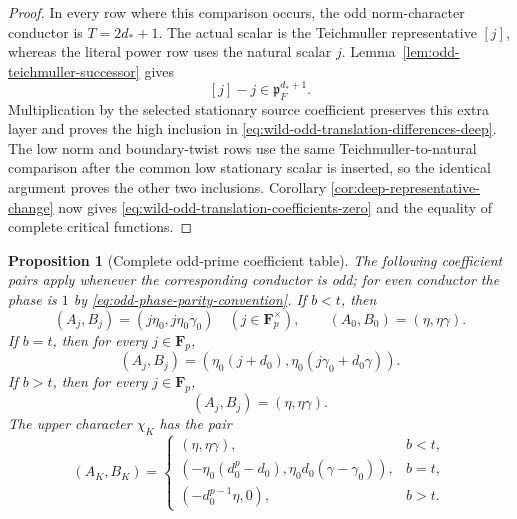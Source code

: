 \documentclass[11pt]{amsart}
\newtheorem{proposition}[theorem]{Proposition}
\theoremstyle{definition}
\theoremstyle{remark}
\newcommand{\F}{\mathbf F}
\newcommand{\p}{\mathfrak p}
\begin{document}
\begin{proof}
In every row where this comparison occurs, the odd norm-character
conductor is $T=2d_*+1$.  The actual scalar is the Teichmuller
representative $[j]$, whereas the literal power row uses the natural
scalar $j$.  Lemma~\ref{lem:odd-teichmuller-successor} gives
\[
 [j]-j\in\p_F^{d_*+1}.
\]
Multiplication by the selected stationary source coefficient preserves
this extra layer and proves the high inclusion in
\eqref{eq:wild-odd-translation-differences-deep}.  The low norm and
boundary-twist rows use the same Teichmuller-to-natural comparison after
the common low stationary scalar is inserted, so the identical argument
proves the other two inclusions.  Corollary
\ref{cor:deep-representative-change} now gives
\eqref{eq:wild-odd-translation-coefficients-zero} and the equality of
complete critical functions.
\end{proof}

\begin{proposition}[Complete odd-prime coefficient table]
\label{prop:odd-coefficient-table}
The following coefficient pairs apply whenever the corresponding
conductor is odd; for even conductor the phase is $1$ by
\eqref{eq:odd-phase-parity-convention}.  If $b<t$, then
\begin{equation}\label{eq:lower-coeff-table-below}
 (A_j,B_j)=(j\eta_0,j\eta_0\gamma_0)
 \quad(j\in\F_p^\times),
 \qquad
 (A_0,B_0)=(\eta,\eta\gamma).
\end{equation}
If $b=t$, then for every $j\in\F_p$,
\begin{equation}\label{eq:lower-coeff-table-boundary}
 (A_j,B_j)=
 (\eta_0(j+d_0),\eta_0(j\gamma_0+d_0\gamma)).
\end{equation}
If $b>t$, then for every $j\in\F_p$,
\begin{equation}\label{eq:lower-coeff-table-above}
 (A_j,B_j)=(\eta,\eta\gamma).
\end{equation}
The upper character $\chi_K$ has the pair
\begin{equation}\label{eq:upper-coeff-table}
 (A_K,B_K)=
 \begin{cases}
 (\eta,\eta\gamma),&b<t,\\[1mm]
 (-\eta_0(d_0^p-d_0),
   \eta_0d_0(\gamma-\gamma_0)),&b=t,\\[1mm]
 (-d_0^{p-1}\eta,0),&b>t.
 \end{cases}
\end{equation}
\end{proposition}
\end{document}
